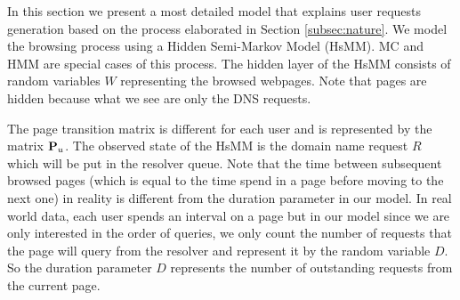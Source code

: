 	In this section we present a most detailed model that explains
        user requests generation based on the process elaborated in
        Section \ref{subsec:nature}.  We model the browsing process
        using a Hidden Semi-Markov Model (HsMM).  MC and HMM are
        special cases of this process.  The hidden layer of the HsMM
        consists of random variables $W$ representing the browsed
        webpages.  Note that pages are hidden because what we see are
        only the DNS requests.

	
	The page transition matrix is different for each user and is
        represented by the matrix $\P_u$.  
        The observed state of the HsMM is the domain name request $R$
        which will be put in the resolver queue.
	Note that the time between subsequent browsed pages (which is equal to the time spend in a page before moving to the next one) in reality is different from the duration parameter in our model.
	In real world data, each user spends an interval on a page but in our model since we are only interested in the order of queries, we only count the number of requests that the page will query from the resolver and represent it by the random variable $D$.
	So the duration parameter $D$ represents the number of outstanding requests from the current page.
	
	
